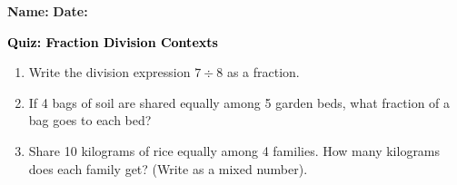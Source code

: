 \documentclass[12pt, letterpaper, fleqn]{article}
\begin{document}
\textbf{Name:} \underline{\hspace{5cm}}
\hfill
\textbf{Date:} \underline{\hspace{3cm}}\\

\begin{tcolorbox}[colback=customteal!20]
    \large\textcolor{black}{\textbf{Quiz: Fraction Division Contexts}}
\end{tcolorbox}
\begin{enumerate}[itemsep=3.5cm, leftmargin=0.6cm]
\item Write the division expression $7 \div 8$ as a fraction.
\vspace{3.5cm}
\item If 4 bags of soil are shared equally among 5 garden beds, what fraction of a bag goes to each bed?
\vspace{3.5cm}
\item Share 10 kilograms of rice equally among 4 families. How many kilograms does each family get? (Write as a mixed number).
\end{enumerate}
\end{document}
